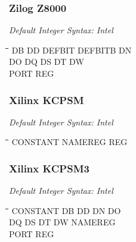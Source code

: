 \subsubsection{Zilog Z8000}

{\em Default Integer Syntax: Intel}

{\tt\begin{tabbing}
\hspace{3cm}\=\hspace{3cm}\=\hspace{3cm}\=\hspace{3cm}\=\kill
DB         \> DD          \> DEFBIT      \> DEFBITB    \> DN \\
DO         \> DQ          \> DS          \> DT         \> DW \\
PORT       \> REG         \\
\end{tabbing}}

\subsubsection{Xilinx KCPSM}

{\em Default Integer Syntax: Intel}

{\tt\begin{tabbing}
\hspace{3cm}\=\hspace{3cm}\=\hspace{3cm}\=\hspace{3cm}\=\kill
CONSTANT   \> NAMEREG     \> REG \\
\end{tabbing}}

\subsubsection{Xilinx KCPSM3}

{\em Default Integer Syntax: Intel}

{\tt\begin{tabbing}
\hspace{3cm}\=\hspace{3cm}\=\hspace{3cm}\=\hspace{3cm}\=\kill
CONSTANT   \> DB         \> DD          \> DN          \> DO \\
DQ         \> DS         \> DT          \> DW          \> NAMEREG \\
PORT       \> REG \\
\end{tabbing}}

